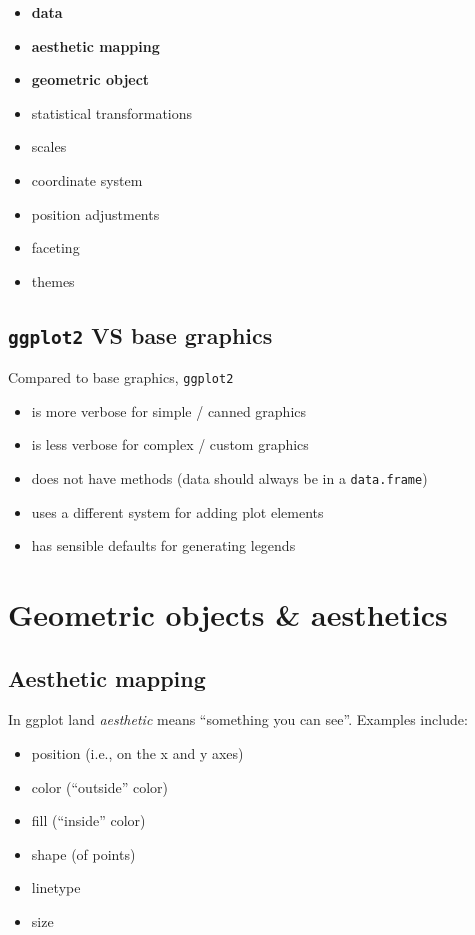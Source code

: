 \documentclass[]{book}
\providecommand{\tightlist}{%
  \setlength{\itemsep}{0pt}\setlength{\parskip}{0pt}}
\begin{document}
\begin{itemize}
\tightlist
\item
  \textbf{data}
\item
  \textbf{aesthetic mapping}
\item
  \textbf{geometric object}
\item
  statistical transformations
\item
  scales
\item
  coordinate system
\item
  position adjustments
\item
  faceting
\item
  themes
\end{itemize}

\subsection{\texorpdfstring{\texttt{ggplot2} VS base
graphics}{ggplot2 VS base graphics}}\label{ggplot2-vs-base-graphics}

Compared to base graphics, \texttt{ggplot2}

\begin{itemize}
\tightlist
\item
  is more verbose for simple / canned graphics
\item
  is less verbose for complex / custom graphics
\item
  does not have methods (data should always be in a \texttt{data.frame})
\item
  uses a different system for adding plot elements
\item
  has sensible defaults for generating legends
\end{itemize}

\section{Geometric objects \&
aesthetics}\label{geometric-objects-aesthetics}

\subsection{Aesthetic mapping}\label{aesthetic-mapping}

In ggplot land \emph{aesthetic} means ``something you can see''.
Examples include:

\begin{itemize}
\tightlist
\item
  position (i.e., on the x and y axes)
\item
  color (``outside'' color)
\item
  fill (``inside'' color)
\item
  shape (of points)
\item
  linetype
\item
  size
\end{itemize}
\end{document}
